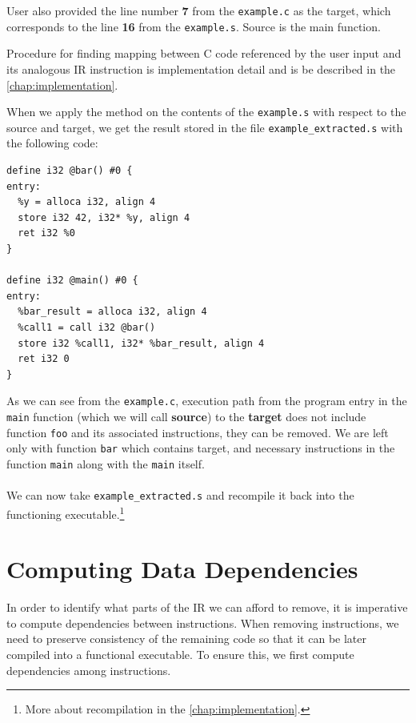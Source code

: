 \documentclass[12pt, twoside]{fithesis2}
\renewcommand{\_}{\leavevmode \kern0.07em\vbox{\hrule width0.4em}}
\begin{document}
User also provided the line number \textbf{7} from the
\texttt{example.c} as the target, which corresponds to the line
\textbf{16} from the \texttt{example.s}. Source is the main function.

Procedure for finding mapping between C code referenced by the user input and
its analogous IR instruction is implementation detail and is be described
in the \autoref{chap:implementation}.

\bigskip

When we apply the method on the contents of the
\texttt{example.s} with respect to the source and target,
we get the result stored in the file
\texttt{example_extracted.s} with the following code:

\begin{verbatim}
define i32 @bar() #0 {
entry:
  %y = alloca i32, align 4
  store i32 42, i32* %y, align 4
  ret i32 %0
}

define i32 @main() #0 {
entry:
  %bar_result = alloca i32, align 4
  %call1 = call i32 @bar()
  store i32 %call1, i32* %bar_result, align 4
  ret i32 0
}
\end{verbatim}

As we can see from the \texttt{example.c}, execution path from
the program entry in the \texttt{main} function (which we will
call \textbf{source}) to the \textbf{target} does not include function
\texttt{foo} and its associated instructions, they can be removed.
We are left only with function \texttt{bar} which contains target,
and necessary instructions in the function \texttt{main} along with
the \texttt{main} itself.
\\
\\
We can now take \texttt{example_extracted.s} and recompile it back
into the functioning executable.\footnote{
More about recompilation in the \autoref{chap:implementation}.
}


\section{Computing Data Dependencies}
\label{sec:design-dep}

In order to identify what parts of the IR we can afford to remove, it is
imperative to compute dependencies between instructions.
When removing instructions, we need to preserve consistency of the remaining
code so that it can be later compiled into a functional executable.
To ensure this, we first compute dependencies among instructions.
\end{document}
